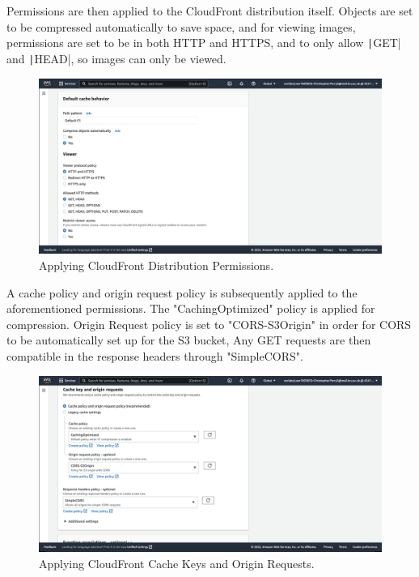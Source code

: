 Permissions are then applied to the CloudFront distribution itself.
Objects are set to be compressed automatically to save space, and for viewing images, permissions are set to be in
both HTTP and HTTPS, and to only allow \texttt|GET| and \texttt|HEAD|, so images can only be viewed.

\begin{figure}[!htbp]
    \centering
    \includegraphics[width=\textwidth]{resources/cloudfront/cloudfront-cache-behaviour}
    \caption{Applying CloudFront Distribution Permissions.}
    \label{fig:cloudfront-cache-behaviour}
\end{figure}

\clearpage
A cache policy and origin request policy is subsequently applied to the aforementioned permissions.
The "CachingOptimized" policy is applied for compression.
Origin Request policy is set to "CORS-S3Origin" in order for CORS to be automatically set up for the S3 bucket,
Any GET requests are then compatible in the response headers through "SimpleCORS".

\begin{figure}[!htbp]
    \centering
    \includegraphics[width=\textwidth]{resources/cloudfront/cloudfront-cache-key}
    \caption{Applying CloudFront Cache Keys and Origin Requests.}
    \label{fig:cloudfront-cache-key}
\end{figure}

